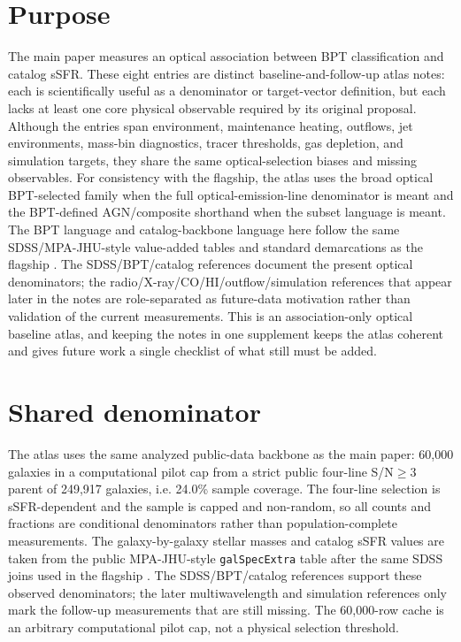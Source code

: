 \documentclass[twocolumn]{aastex631}
\begin{document}
\section{Purpose}
The main paper measures an optical association between BPT classification and catalog sSFR. These eight entries are distinct baseline-and-follow-up atlas notes: each is scientifically useful as a denominator or target-vector definition, but each lacks at least one core physical observable required by its original proposal. Although the entries span environment, maintenance heating, outflows, jet environments, mass-bin diagnostics, tracer thresholds, gas depletion, and simulation targets, they share the same optical-selection biases and missing observables. For consistency with the flagship, the atlas uses the broad optical BPT-selected family when the full optical-emission-line denominator is meant and the BPT-defined AGN/composite shorthand when the subset language is meant. The BPT language and catalog-backbone language here follow the same SDSS/MPA-JHU-style value-added tables and standard demarcations as the flagship \citep{sdssdr17,brinchmann2004,york2000,baldwin1981,kewley2001,kauffmann2003bpt,kewley2006,stasinska2008,stasinska2015}. The SDSS/BPT/catalog references document the present optical denominators; the radio/X-ray/CO/HI/outflow/simulation references that appear later in the notes are role-separated as future-data motivation rather than validation of the current measurements. This is an association-only optical baseline atlas, and keeping the notes in one supplement keeps the atlas coherent and gives future work a single checklist of what still must be added.

\section{Shared denominator}
The atlas uses the same analyzed public-data backbone as the main paper: 60,000 galaxies in a computational pilot cap from a strict public four-line S/N$\geq3$ parent of 249,917 galaxies, i.e. 24.0\% sample coverage. The four-line selection is sSFR-dependent and the sample is capped and non-random, so all counts and fractions are conditional denominators rather than population-complete measurements. The galaxy-by-galaxy stellar masses and catalog sSFR values are taken from the public MPA-JHU-style \texttt{galSpecExtra} table after the same SDSS joins used in the flagship \citep{sdssdr17,brinchmann2004,york2000}. The SDSS/BPT/catalog references support these observed denominators; the later multiwavelength and simulation references only mark the follow-up measurements that are still missing. The 60,000-row cache is an arbitrary computational pilot cap, not a physical selection threshold.
\end{document}

